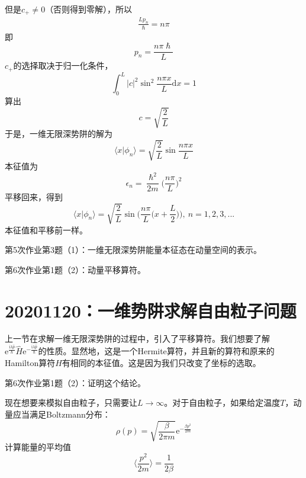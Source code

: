        但是$c_+ \neq 0$（否则得到零解），所以
        \begin{equation}\begin{aligned}
            \frac {Lp_n}{\hslash} = n\pi
        \end{aligned}\end{equation}
        即
        \[ p_n = \frac {n\pi \hslash}{L} \]
        $c_+$的选择取决于归一化条件，
        \[ \int_0^L |c|^2 \sin^2{\frac {n\pi x}L}\mathrm{d}x = 1 \]
        算出
        \[ c = \sqrt{\frac 2L} \]
        于是，一维无限深势阱的解为
        \[ \langle x|\phi_n \rangle = \sqrt{\frac 2L} \sin{\frac {n\pi x}L} \]
        本征值为
        \[ \epsilon_n = \frac {\hslash^2}{2m} \bigg(\frac {n\pi}L\bigg)^2 \]
        平移回来，得到
        \[ \langle x|\phi_n \rangle = \sqrt{\frac 2L} \sin{\bigg(\frac {n\pi}L\bigg(x+\frac L2\bigg)\bigg)}, \ n=1,2,3,... \]
        本征值和平移前一样。
        \begin{asg}
            第5次作业第3题（1）：一维无限深势阱能量本征态在动量空间的表示。
        \end{asg}
        \begin{asg}
            第6次作业第1题（2）：动量平移算符。
        \end{asg}

    \section{20201120：一维势阱求解自由粒子问题}
        上一节在求解一维无限深势阱的过程中，引入了平移算符。我们想要了解$\mathrm{e}^{\frac {\mathrm{i}\lambda \hat{p}}{\hslash}} \hat{H} \mathrm{e}^{-\frac {\mathrm{i}\lambda \hat{p}}{\hslash}}$的性质。显然地，这是一个Hermite算符，并且新的算符和原来的Hamilton算符$\hat{H}$有相同的本征值。这是因为我们只改变了坐标的选取。
        \begin{asg}
            第6次作业第1题（2）：证明这个结论。
        \end{asg}
        现在想要来模拟自由粒子，只需要让$L \to \infty$。对于自由粒子，如果给定温度$T$，动量应当满足Boltzmann分布：
        \[ \rho(p) = \sqrt{\frac {\beta}{2\pi m}}\mathrm{e}^{-\frac {\beta p^2}{2m}} \]
        计算能量的平均值
        \[ \langle \frac {p^2}{2m} \rangle = \frac 1{2\beta} \]


